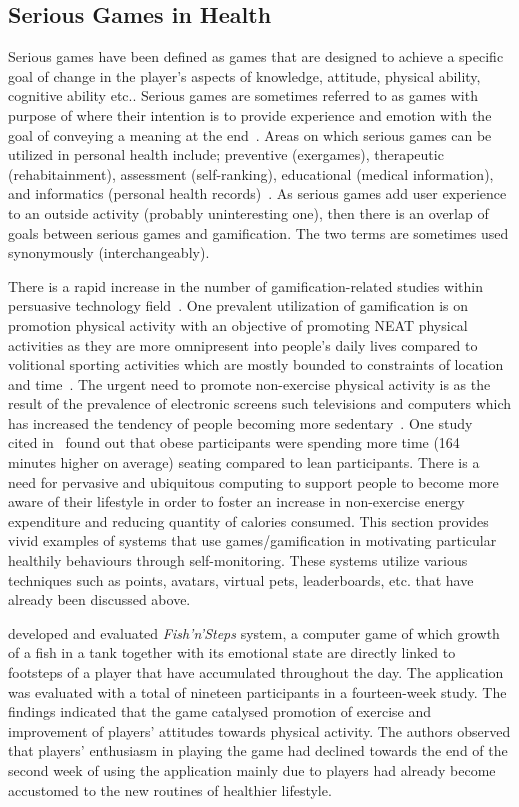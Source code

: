 \subsection{Serious Games in Health}
Serious games have been defined as games that are designed to achieve a specific goal of change in the player's  aspects of knowledge, attitude, physical ability, cognitive ability etc.. Serious games are sometimes referred to as games with purpose of  where their intention is to provide experience and emotion with the goal of conveying a meaning at the end~\citep{marsh2011serious}. Areas on which serious games can be utilized in personal health include; preventive (exergames), therapeutic (rehabitainment), assessment (self-ranking), educational (medical information), and informatics (personal health records)~\citep{mccallum2012gamification}. As serious games add user experience to an outside activity (probably uninteresting one), then there is an overlap of goals between serious games and gamification. The two terms are sometimes used synonymously (interchangeably).

There is a rapid increase in the number of gamification-related studies within persuasive technology field~\citep{hamari2014persuasive}. One prevalent utilization of gamification is on promotion physical activity with an objective of promoting NEAT physical activities as they are more omnipresent into people's daily lives compared to volitional sporting activities which are mostly bounded to constraints of location and time~\citep{fujiki2008neat}. The urgent need to promote non-exercise physical activity is as the result of the prevalence of electronic screens such televisions and computers which has increased the tendency of people becoming more sedentary~\citep{berkovsky2010physical}. One study~\citep{levine2006non} cited in~\cite{fujiki2008neat} found out that obese participants were spending more time (164 minutes higher on average) seating  compared to lean participants. There is a need for pervasive and ubiquitous computing to support people to become more aware of their lifestyle in order to foster an increase in non-exercise energy expenditure and reducing quantity of calories consumed. This section provides vivid examples of systems that use games/gamification in motivating particular healthily  behaviours through self-monitoring. These systems utilize various techniques such as points, avatars, virtual pets, leaderboards, etc. that have already been discussed above. 

\cite{lin2006:fish} developed and evaluated \emph{{Fish'n'Steps}} system, a computer game of which growth of a fish in a tank together with its emotional state are directly linked to footsteps of a player that have accumulated throughout the day. The application was evaluated with a total of nineteen participants in a fourteen-week study. The findings indicated that the game catalysed promotion of exercise and improvement of players’ attitudes towards physical activity. The authors observed that players' enthusiasm in playing the game had declined towards the end of the second week of using the application mainly due to players had already become accustomed to the new routines of healthier lifestyle. 
  
